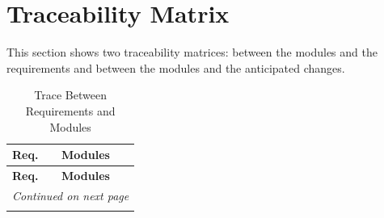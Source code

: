 \documentclass[12pt, titlepage]{article}
\begin{document}
\section{Traceability Matrix} \label{SecTM}

This section shows two traceability matrices: between the modules and the
requirements and between the modules and the anticipated changes.

\begin{longtable}{p{} p{}}
  \caption{Trace Between Requirements and Modules} \label{TblRT} \\
  
  \toprule
  \textbf{Req.} & \textbf{Modules} \\
  \midrule
  \endfirsthead
  
  \toprule
  \textbf{Req.} & \textbf{Modules} \\
  \midrule
  \endhead
  
  \midrule
  \multicolumn{2}{r}{\textit{Continued on next page}} \\
  \midrule
  \endfoot
  
  \bottomrule
  \endlastfoot
  

\end{longtable}
\end{document}
